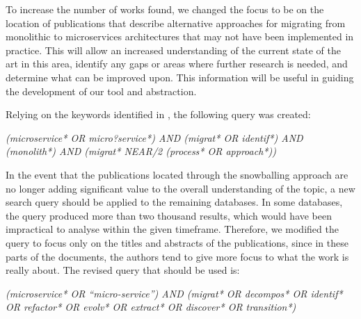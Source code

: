 To increase the number of works found, we changed the focus to be on the
location of publications that describe alternative approaches for migrating
from monolithic to microservices architectures that may not have been
implemented in practice. This will allow an increased understanding of the
current state of the art in this area, identify any gaps or areas where further
research is needed, and determine what can be improved upon. This information
will be useful in guiding the development of our tool and abstraction.

Relying on the keywords identified in , the following query
was created:

\begin{center}
  \emph{(microservice* OR micro?service*) AND (migrat* OR identif*) AND
  (monolith*) AND (migrat* NEAR/2 (process* OR approach*))}
\end{center}

In the event that the publications located through the snowballing approach are
no longer adding significant value to the overall understanding of the topic, a
new search query should be applied to the remaining databases. In some
databases, the query produced more than two thousand results, which would have
been impractical to analyse within the given timeframe. Therefore, we modified
the query to focus only on the titles and abstracts of the publications, since
in these parts of the documents, the authors tend to give more focus to what
the work is really about. The revised query that should be used is:

\begin{center}
  \emph{(microservice* OR ``micro-service'') AND (migrat* OR decompos* OR
  identif* OR refactor* OR evolv* OR extract* OR discover* OR transition*)}
\end{center}
